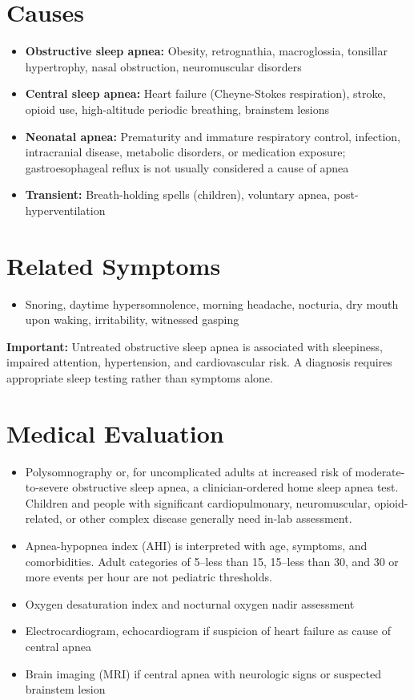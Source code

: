 \section*{Causes}
\begin{itemize}
 \item \textbf{Obstructive sleep apnea:} Obesity, retrognathia, macroglossia, tonsillar hypertrophy, nasal obstruction, neuromuscular disorders
 \item \textbf{Central sleep apnea:} Heart failure (Cheyne-Stokes respiration), stroke, opioid use, high-altitude periodic breathing, brainstem lesions
 \item \textbf{Neonatal apnea:} Prematurity and immature respiratory control, infection, intracranial disease, metabolic disorders, or medication exposure; gastroesophageal reflux is not usually considered a cause of apnea
 \item \textbf{Transient:} Breath-holding spells (children), voluntary apnea, post-hyperventilation
\end{itemize}

\section*{Related Symptoms}
\begin{itemize}
 \item Snoring, daytime hypersomnolence, morning headache, nocturia, dry mouth upon waking, irritability, witnessed gasping
\end{itemize}
\textbf{Important:} Untreated obstructive sleep apnea is associated with sleepiness, impaired attention, hypertension, and cardiovascular risk. A diagnosis requires appropriate sleep testing rather than symptoms alone.

\section*{Medical Evaluation}
\begin{itemize}
 \item Polysomnography or, for uncomplicated adults at increased risk of moderate-to-severe obstructive sleep apnea, a clinician-ordered home sleep apnea test. Children and people with significant cardiopulmonary, neuromuscular, opioid-related, or other complex disease generally need in-lab assessment.
 \item Apnea-hypopnea index (AHI) is interpreted with age, symptoms, and comorbidities. Adult categories of 5--less than 15, 15--less than 30, and 30 or more events per hour are not pediatric thresholds.
 \item Oxygen desaturation index and nocturnal oxygen nadir assessment
 \item Electrocardiogram, echocardiogram if suspicion of heart failure as cause of central apnea
 \item Brain imaging (MRI) if central apnea with neurologic signs or suspected brainstem lesion
\end{itemize}


